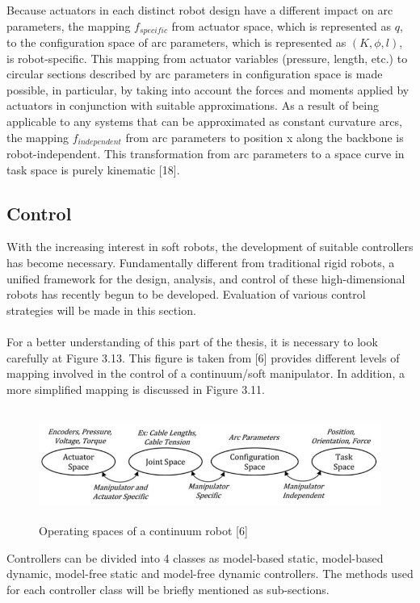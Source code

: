 \documentclass[12pt,twoside,a4]{mwbk}
\begin{document}
\noindent Because actuators in each distinct robot design have a different impact on arc parameters, the mapping $f_{specific}$ from actuator space, which is represented as $q$, to the configuration space of arc parameters, which is represented as $(K,\phi,l)$, is robot-specific. This mapping from actuator variables (pressure, length, etc.) to circular sections described by arc parameters in configuration space is made possible, in particular, by taking into account the forces and moments applied by actuators in conjunction with suitable approximations. As a result of being applicable to any systems that can be approximated as constant curvature arcs, the mapping $f_{independent}$ from arc parameters to position x along the backbone is robot-independent. This transformation from arc parameters to a space curve in task space is purely kinematic [18].

\subsection{Control}
With the increasing interest in soft robots, the development of suitable controllers has become necessary. Fundamentally different from traditional rigid robots, a unified framework for the design, analysis, and control of these high-dimensional robots has recently begun to be developed. Evaluation of various control strategies will be made in this section. 
\\ \\
For a better understanding of this part of the thesis, it is necessary to look carefully at Figure 3.13. This figure is taken from [6] provides different levels of mapping involved in the control of a continuum/soft manipulator. In addition, a more simplified mapping is discussed in Figure 3.11.
\begin{figure}[h]
    \centering
    \includegraphics[width=14.0cm, height=3.63cm]{map2.JPG}
    \caption{Operating spaces of a continuum robot [6]}
\end{figure}

\noindent Controllers can be divided into 4 classes as model-based static, model-based dynamic, model-free static and model-free dynamic controllers. The methods used for each controller class will be briefly mentioned as sub-sections. 
\end{document}
